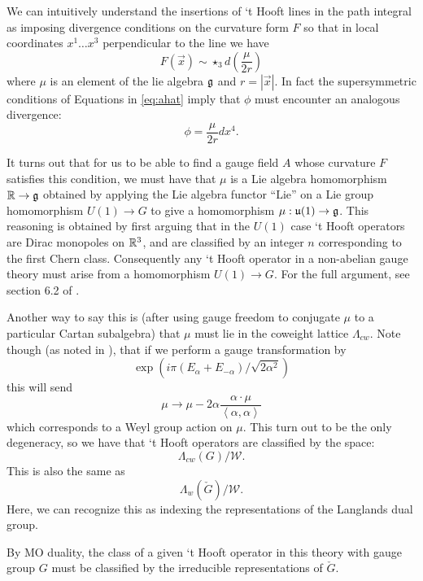 	We can intuitively understand the insertions of `t Hooft lines in the path integral as imposing divergence conditions on the curvature form $F$ so that in local coordinates $x^1 \dots x^3$ perpendicular to the line we have
		\begin{equation}\label{eq:AmodF}
			F(\vec{x}) \sim \star_3 d\left( \frac{\mu}{2r} \right)
		\end{equation}
		where $\mu$ is an element of the lie algebra $\frak g$ and $r = |\vec x|$. 
		In fact the supersymmetric conditions of Equations in \eqref{eq:ahat} imply that $\phi$ must encounter an analogous divergence:
		\begin{equation}\label{eq:Amodphi}
			\phi = \frac{\mu}{2r} dx^4.
		\end{equation}
		
		It turns out that for us to be able to find a gauge field $A$ whose curvature $F$ satisfies this condition, we must have that $\mu$ is a Lie algebra homomorphism $\mathbb R \to \frak g$ obtained by applying the Lie algebra functor ``$\mathrm{Lie}$'' on a Lie group homomorphism $U(1) \to G$ to give a homomorphism $\mu: \frak u(1) \to \gg$. This reasoning is obtained by first arguing that in the $U(1)$ case `t Hooft operators are Dirac monopoles on $\rr^3$, and are classified by an integer $n$ corresponding to the first Chern class. Consequently any `t Hooft operator in a non-abelian gauge theory must arise from a homomorphism $U(1)\to G$. For the full argument, see section 6.2 of \cite{kapustin2006}.
		
		
		Another way to say this is (after using gauge freedom to conjugate $\mu$ to a particular Cartan subalgebra) that $\mu$ must lie in the coweight lattice $\Lambda_{cw}$. Note though (as noted in \cite{goddard1977}), that if we perform a gauge transformation by
		\[
			\exp(i \pi (E_\alpha + E_{-\alpha})/\sqrt{2 \alpha^2})	
		\]
		this will send
		\[
			\mu \to \mu - 2 \alpha \frac{\alpha \cdot \mu}{\left<\alpha, \alpha\right>}
		\]
		which corresponds to a Weyl group action on $\mu$. This turn out to be the only degeneracy, so we have that `t Hooft operators are classified by the space:
		\[
			\Lambda_{cw}(G)/\mathcal W.
		\]
		This is also the same as 
		\[
			\Lambda_{w}(\check G)/\mathcal W.	
		\]
		Here, we can recognize this as indexing the representations of the Langlands dual group. 
		\begin{obs}
			By MO duality, the class of a given `t Hooft operator in this theory with gauge group $G$ must be classified by the irreducible representations of $\check G$.
		\end{obs}
		
